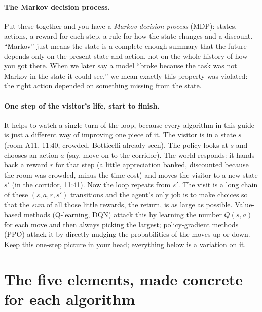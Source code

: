 \documentclass[11pt]{article}
\newcommand{\key}[1]{\textit{#1}}            %
\begin{document}
\paragraph{The Markov decision process.} Put these together and you have a \key{Markov
decision process} (MDP): states, actions, a reward for each step, a rule for how the
state changes and a discount. ``Markov'' just means the state is a complete enough
summary that the future depends only on the present state and action, not on the whole
history of how you got there. When we later say a model ``broke because the task was not
Markov in the state it could see,'' we mean exactly this property was violated: the right
action depended on something missing from the state.

\paragraph{One step of the visitor's life, start to finish.} It helps to watch a single
turn of the loop, because every algorithm in this guide is just a different way of
improving one piece of it. The visitor is in a state $s$ (room A11, 11:40, crowded,
Botticelli already seen). The policy looks at $s$ and chooses an action $a$ (say, move on
to the corridor). The world responds: it hands back a reward $r$ for that step (a little
appreciation banked, discounted because the room was crowded, minus the time cost) and
moves the visitor to a new state $s'$ (in the corridor, 11:41). Now the loop repeats from
$s'$. The visit is a long chain of these $(s, a, r, s')$ transitions and the agent's only
job is to make choices so that the \emph{sum} of all those little rewards, the return, is
as large as possible. Value-based methods (Q-learning, DQN) attack this by learning the
number $Q(s,a)$ for each move and then always picking the largest; policy-gradient methods
(PPO) attack it by directly nudging the probabilities of the moves up or down. Keep this
one-step picture in your head; everything below is a variation on it.

\section{The five elements, made concrete for each algorithm}\label{sec:concrete}
\end{document}
